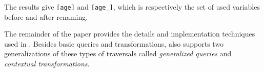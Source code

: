 
The results give \lstinline{[age]} and \lstinline{[age_]}, which
is respectively the set of used variables before and after renaming.

The remainder of the paper provides the details and implementation
techniques used in \Name. Besides basic queries and transformations,
\name also supports two generalizations of these types of traversals
called \emph{generalized queries} and \emph{contextual transformations}.

